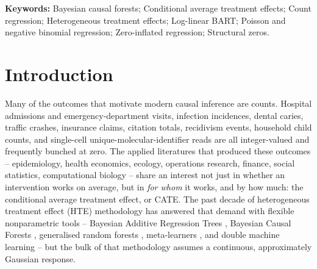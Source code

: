 \documentclass[11pt]{article}
\theoremstyle{plain}
\theoremstyle{definition}
\theoremstyle{remark}
\begin{document}
\noindent\textbf{Keywords:} Bayesian causal forests; Conditional average
treatment effects; Count regression; Heterogeneous treatment effects;
Log-linear BART; Poisson and negative binomial regression;
Zero-inflated regression; Structural zeros.

\section{Introduction}\label{sec:intro}

Many of the outcomes that motivate modern causal inference are
counts. Hospital admissions and emergency-department visits,
infection incidences, dental caries, traffic crashes, insurance
claims, citation totals, recidivism events, household child counts,
and single-cell unique-molecular-identifier reads are all
integer-valued and frequently bunched at zero. The applied
literatures that produced these outcomes -- epidemiology, health
economics, ecology, operations research, finance, social statistics,
computational biology -- share an interest not just in whether an
intervention works on average, but in \emph{for whom} it works, and
by how much: the conditional average treatment effect, or CATE. The
past decade of heterogeneous treatment effect (HTE) methodology has
answered that demand with flexible nonparametric tools -- Bayesian
Additive Regression Trees \citep{chipman2010bart, hill2011bayesian},
Bayesian Causal Forests \citep[BCF;][]{hahn2020bayesian}, generalised
random forests \citep{athey2019generalized}, meta-learners
\citep{kunzel2019metalearners}, and double machine learning
\citep{chernozhukov2018double} -- but the bulk of that methodology
assumes a continuous, approximately Gaussian response.
\end{document}
